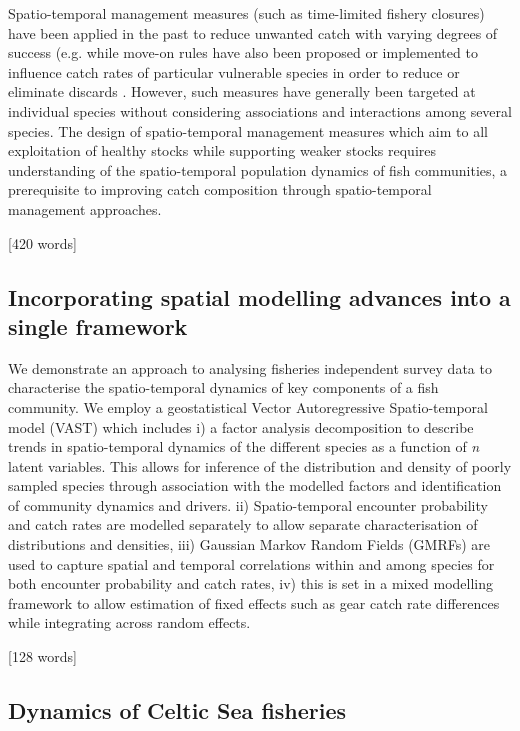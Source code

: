 \documentclass{nature}
\begin{document}
\begin{linenumbers}
Spatio-temporal management measures (such as time-limited fishery closures)
have been applied in the past to reduce unwanted catch with varying degrees of
success (e.g. \cite{Needle2011, Holmes2011, Beare2010, Dinmore2003} while
move-on rules have also been proposed or implemented to influence catch rates
of particular vulnerable species in order to reduce or eliminate discards
\cite{Gardner2008, Dunn2011, Dunn2014a}. However, such measures have generally
been targeted at individual species without considering associations and
interactions among several species. The design of spatio-temporal management
measures which aim to all exploitation of healthy stocks while supporting
weaker stocks requires understanding of the spatio-temporal population dynamics
of fish communities, a prerequisite to improving catch composition through
spatio-temporal management approaches. 

[420 words]

\subsection{Incorporating spatial modelling advances into a single framework}

We demonstrate an approach to analysing fisheries independent survey data to
characterise the spatio-temporal dynamics of key components of a fish
community. We employ a geostatistical Vector Autoregressive Spatio-temporal
model (VAST) which includes i) a factor analysis decomposition to describe
trends in spatio-temporal dynamics of the different species as a function of
\textit{n} latent variables. This allows for inference of the distribution and
density of poorly sampled species through association with the modelled factors
and identification of community dynamics and drivers. ii) Spatio-temporal
encounter probability and catch rates are modelled separately to allow separate
characterisation of distributions and densities, iii) Gaussian Markov Random
Fields (GMRFs) are used to capture spatial and temporal correlations within and
among species for both encounter probability and catch rates, iv) this is set
in a mixed modelling framework to allow estimation of fixed effects such as
gear catch rate differences while integrating across random effects.

[128 words]

\subsection{Dynamics of Celtic Sea fisheries}


\end{linenumbers}
\end{document}
